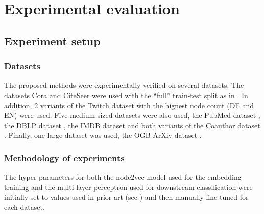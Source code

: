 \section{Experimental evaluation}\label{sec:experimental-evaluation}

\subsection{Experiment setup}

\subsubsection{Datasets}

The proposed methods were experimentally verified on several datasets. The datasets Cora and CiteSeer \cite{yang_revisiting_2016} were used with the \enquote{full} train-test split as in \cite{chen_fastgcn_2018}. In addition, 2 variants of the Twitch dataset \cite{rozemberczki_multi-scale_2021} with the hignest node count (DE and EN) were used. Five medium sized datasets were also used, the PubMed dataset \cite{yang_revisiting_2016}, the DBLP dataset \cite{bojchevski_deep_2018}, the IMDB dataset \cite{fu_magnn_2020} and both variants of the Coauthor dataset \cite{shchur_pitfalls_2019}. Finally, one large dataset was used, the OGB ArXiv dataset \cite{hu_open_2021}.

\subsubsection{Methodology of experiments}

The hyper-parameters for both the node2vec model used for the embedding training and the multi-layer perceptron used for downstream classification were initially set to values used in prior art (see \cite{hu_open_2021,fey_fast_2019}) and then manually fine-tuned for each dataset.

